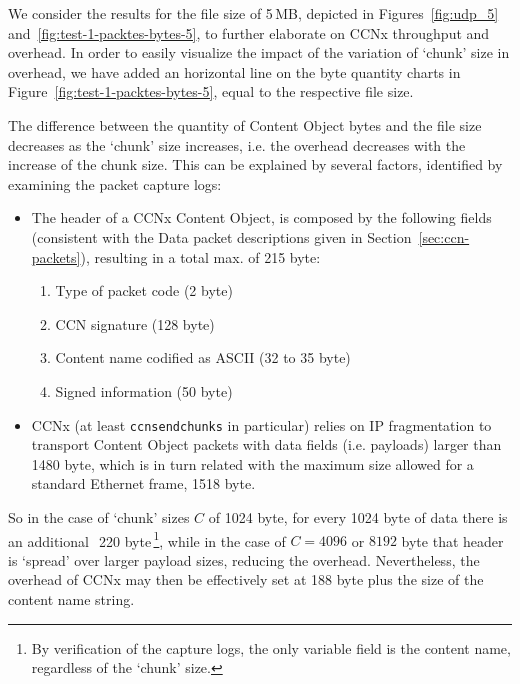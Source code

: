 We consider the results for the file size of 5\,MB, depicted in 
Figures~\ref{fig:udp_5} and~\ref{fig:test-1-packtes-bytes-5}, to further 
elaborate on CCNx throughput and overhead. 
In order to easily visualize the impact of the variation of `chunk' size in 
overhead, we have added an horizontal line on the byte quantity charts in 
Figure~\ref{fig:test-1-packtes-bytes-5}, equal to the respective file 
size.\vertbreak 

The difference between the quantity of Content Object bytes and the 
file size decreases as the `chunk' size increases, i.e. the overhead decreases 
with the increase of the chunk size. This can be explained by several 
factors, identified by examining the packet 
capture logs:

\begin{itemize}

    \item The header of a CCNx Content Object, is composed 
        by the following fields (consistent with the Data packet
        descriptions given in Section~\ref{sec:ccn-packets}), resulting in a 
        total max. of 215 byte:

        \begin{enumerate}

            \item Type of packet code (2 byte)
            \item CCN signature (128 byte)
            \item Content name codified as ASCII (32 to 35 byte)
            \item Signed information (50 byte)

        \end{enumerate}

    \item CCNx (at least \verb+ccnsendchunks+ in particular) relies on IP 
        fragmentation to transport Content Object packets with data fields (i.e. 
        payloads) larger than 1480 byte, which is in turn related with the 
        maximum size allowed for a standard Ethernet frame, 1518 byte.

\end{itemize}

So in the case of `chunk' sizes $C$ of 1024 byte, for every 1024 byte of data 
there is an 
additional $~$\,220 byte\,\footnote{By verification of the capture logs, the 
only variable field is the content name, regardless of the `chunk' size.}, while 
in the case of $C = 4096$ or $8192$ byte that header is `spread' over larger 
payload sizes, reducing the overhead. Nevertheless, the overhead of CCNx may 
then be effectively set at 188 byte plus the size of the content name string.\vertbreak

